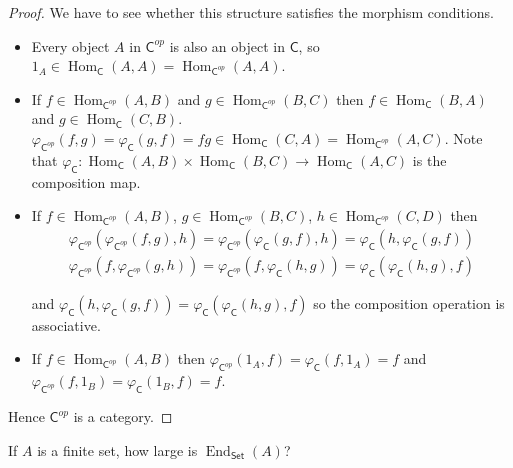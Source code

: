 \begin{proof}
	We have to see whether this structure satisfies the morphism conditions.
	\begin{itemize}
		\item Every object $A$ in ${\mathsf{C}}^{op}$ is also an object in $\mathsf{C}$, so $1_{A} \in \operatorname{Hom}_{\mathsf{C}}(A, A) = \operatorname{Hom}_{{\mathsf{C}}^{op}}(A, A)$.
		\item If $f\in \operatorname{Hom}_{{\mathsf{C}}^{op}}(A, B)$ and $g\in \operatorname{Hom}_{{\mathsf{C}}^{op}}(B, C)$ then $f\in \operatorname{Hom}_{\mathsf{C}}(B, A)$ and $g\in \operatorname{Hom}_{\mathsf{C}}(C, B)$. $\varphi_{{\mathsf{C}}^{op}}(f, g) = \varphi_{\mathsf{C}}(g, f) = fg\in \operatorname{Hom}_{\mathsf{C}}(C, A) = \operatorname{Hom}_{{\mathsf{C}}^{op}}(A, C)$. Note that $\varphi_{\mathsf{C}}: \operatorname{Hom}_{\mathsf{C}}(A, B)\times \operatorname{Hom}_{\mathsf{C}}(B, C)\to \operatorname{Hom}_{\mathsf{C}}(A, C)$ is the composition map.
		\item If $f\in \operatorname{Hom}_{{\mathsf{C}}^{op}}(A, B)$, $g\in \operatorname{Hom}_{{\mathsf{C}}^{op}}(B, C)$, $h\in \operatorname{Hom}_{{\mathsf{C}}^{op}}(C, D)$ then
		      \begin{align*}
			      \varphi_{{\mathsf{C}}^{op}}(\varphi_{{\mathsf{C}}^{op}}(f, g), h) = \varphi_{{\mathsf{C}}^{op}}(\varphi_{\mathsf{C}}(g, f), h) = \varphi_{\mathsf{C}}(h, \varphi_{\mathsf{C}}(g, f)) \\
			      \varphi_{{\mathsf{C}}^{op}}(f, \varphi_{{\mathsf{C}}^{op}}(g, h)) = \varphi_{{\mathsf{C}}^{op}}(f, \varphi_{\mathsf{C}}(h, g)) = \varphi_{\mathsf{C}}(\varphi_{\mathsf{C}}(h, g), f)
		      \end{align*}

		      and $\varphi_{\mathsf{C}}(h, \varphi_{\mathsf{C}}(g, f)) = \varphi_{\mathsf{C}}(\varphi_{\mathsf{C}}(h, g), f)$ so the composition operation is associative.
		\item If $f\in \operatorname{Hom}_{{\mathsf{C}}^{op}}(A, B)$ then $\varphi_{{\mathsf{C}}^{op}}(1_{A}, f) = \varphi_{\mathsf{C}}(f, 1_{A}) = f$ and $\varphi_{{\mathsf{C}}^{op}}(f, 1_{B}) = \varphi_{\mathsf{C}}(1_{B}, f) = f$.
	\end{itemize}

	Hence ${\mathsf{C}}^{op}$ is a category.
\end{proof}

\begin{exercise}{3.2}
	If $A$ is a finite set, how large is $\operatorname{End}_{\mathsf{Set}}(A)$?
\end{exercise}

